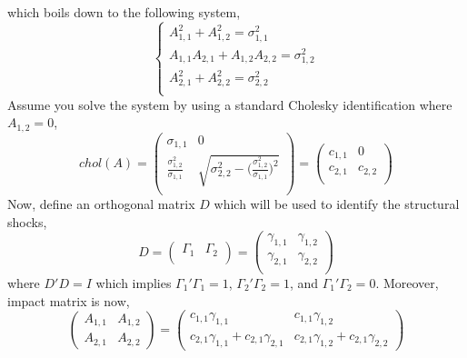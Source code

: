 \documentclass[14pt]{article}
\begin{document}
which boils down to the following system,
$$
\begin{cases}
A_{1,1}^2 + A_{1,2}^2 = \sigma^2_{1,1} \\
A_{1,1} A_{2,1} + A_{1,2} A_{2,2} = \sigma^2_{1,2} \\
A_{2,1}^2 + A_{2,2}^2 = \sigma^2_{2,2} \\
\end{cases}
$$
Assume you solve the system by using a standard Cholesky identification where $A_{1,2} = 0$,
$$
chol(A) = \begin{pmatrix}
\sigma_{1,1} & 0 \\
\frac{\sigma_{1,2}^2}{\sigma_{1,1}} & \sqrt{\sigma_{2,2}^2 - \Big( \frac{\sigma_{1,2}^2}{\sigma_{1,1}} \Big)^2} \\
\end{pmatrix} = \begin{pmatrix}
c_{1,1} & 0 \\
c_{2,1} & c_{2,2} \\
\end{pmatrix}
$$
Now, define an orthogonal matrix $D$ which will be used to identify the structural shocks,
$$
D = \begin{pmatrix}
\Gamma_{1} & \Gamma_{2} \\
\end{pmatrix} = \begin{pmatrix}
\gamma_{1,1} & \gamma_{1,2} \\
\gamma_{2,1} & \gamma_{2,2} \\
\end{pmatrix} 
$$ 
where $D'D = I$ which implies $\Gamma_1'\Gamma_1 = 1$, $\Gamma_2'\Gamma_2 = 1$, and $\Gamma_1'\Gamma_2 = 0$. Moreover, impact matrix is now,
$$
\begin{pmatrix}
A_{1,1} & A_{1,2} \\
A_{2,1} & A_{2,2}
\end{pmatrix} = \begin{pmatrix}
c_{1,1} \gamma_{1,1} & c_{1,1} \gamma_{1,2} \\
c_{2,1} \gamma_{1,1} + c_{2,1} \gamma_{2,1} & c_{2,1} \gamma_{1,2} + c_{2,1} \gamma_{2,2}
\end{pmatrix}
$$
\end{document}
